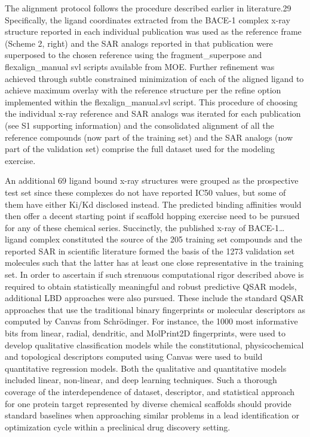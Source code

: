 The alignment protocol follows the procedure described earlier in literature.29  Specifically, the ligand coordinates extracted from the BACE-1 complex x-ray structure reported in each individual publication was used as the reference frame (Scheme 2, right) and the SAR analogs reported in that publication were superposed to the chosen reference using the fragment\_superpose and flexalign\_manual svl scripts available from MOE.  Further refinement was achieved through subtle constrained minimization of each of the aligned ligand to achieve maximum overlay with the reference structure per the refine option implemented within the flexalign\_manual.svl script.  This procedure of choosing the individual x-ray reference and SAR analogs was iterated for each publication (see S1 supporting information) and the consolidated alignment of all the reference compounds (now part of the training set) and the SAR analogs (now part of the validation set) comprise the full dataset used for the modeling exercise. 

An additional 69 ligand bound x-ray structures were grouped as the prospective test set since these complexes do not have reported IC50 values, but some of them have either Ki/Kd disclosed instead.  The predicted binding affinities would then offer a decent starting point if scaffold hopping exercise need to be pursued for any of these chemical series.   Succinctly, the published x-ray of BACE-1…ligand complex constituted the source of the 205 training set compounds and the reported SAR in scientific literature formed the basis of the 1273 validation set molecules such that the latter has at least one close representative in the training set. 
In order to ascertain if such strenuous computational rigor described above is required to obtain statistically meaningful and robust predictive QSAR models, additional LBD approaches were also pursued.  These include the standard QSAR approaches that use the traditional binary fingerprints or molecular descriptors as computed by Canvas from Schrödinger.  For instance, the 1000 most informative bits from linear, radial, dendritic, and MolPrint2D fingerprints, were used to develop qualitative classification models while the constitutional, physicochemical and topological descriptors computed using Canvas were used to build quantitative regression models.  Both the qualitative and quantitative models included linear, non-linear, and deep learning techniques.  Such a thorough coverage of the interdependence of dataset, descriptor, and statistical approach for one protein target represented by diverse chemical scaffolds should provide standard baselines when approaching similar problems in a lead identification or optimization cycle within a preclinical drug discovery setting.

